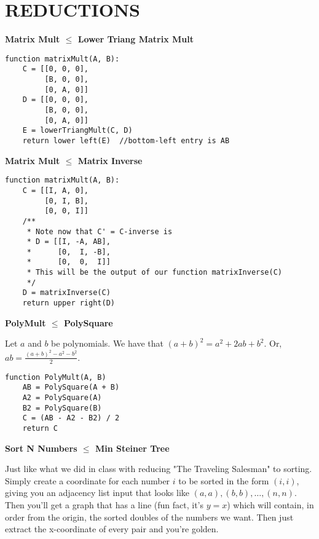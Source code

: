 \documentclass[12pt]{article}
\providecommand{\reducible}[2]{
  \textbf{#1} $\leq$ \textbf{#2}
}
\begin{document}
\section{REDUCTIONS}
\begin{centering}\textbf{\reducible{Matrix Mult}{Lower Triang Matrix Mult}}\par\end{centering}
\begin{lstlisting}
function matrixMult(A, B):
    C = [[0, 0, 0],
         [B, 0, 0],
         [0, A, 0]]
    D = [[0, 0, 0],
         [B, 0, 0],
         [0, A, 0]]
    E = lowerTriangMult(C, D)
    return lower left(E)  //bottom-left entry is AB
\end{lstlisting}


\begin{centering}\textbf{\reducible{Matrix Mult}{Matrix Inverse}}\par\end{centering}
\begin{lstlisting}
function matrixMult(A, B):
    C = [[I, A, 0],
         [0, I, B],
         [0, 0, I]]
    /**
     * Note now that C' = C-inverse is
     * D = [[I, -A, AB],
     *      [0,  I, -B],
     *      [0,  0,  I]]
     * This will be the output of our function matrixInverse(C)
     */
    D = matrixInverse(C)
    return upper right(D)
\end{lstlisting}


\begin{centering}\textbf{\reducible{PolyMult}{PolySquare}}\par\end{centering}
Let $a$ and $b$ be polynomials.
We have that $(a+b)^2 = a^2 + 2ab + b^2$.
Or, $\displaystyle ab = \frac{(a+b)^2 - a^2 - b^2}{2}$.\\
\begin{lstlisting}
function PolyMult(A, B)
    AB = PolySquare(A + B)
    A2 = PolySquare(A)
    B2 = PolySquare(B)
    C = (AB - A2 - B2) / 2
    return C
\end{lstlisting}

\begin{centering}\textbf{\reducible{Sort N Numbers}{Min Steiner Tree}}\par\end{centering}
Just like what we did in class with reducing "The Traveling Salesman" to sorting.
Simply create a coordinate for each number $i$ to be sorted in the form $(i,i)$,
giving you an adjacency list input that looks like $(a,a),(b,b), \dots, (n,n)$.
Then you'll get a graph that has a line (fun fact, it's $y=x$) which will contain,
in order from the origin, the sorted doubles of the numbers we want.
Then just extract the x-coordinate of every pair and you're golden.
\end{document}

